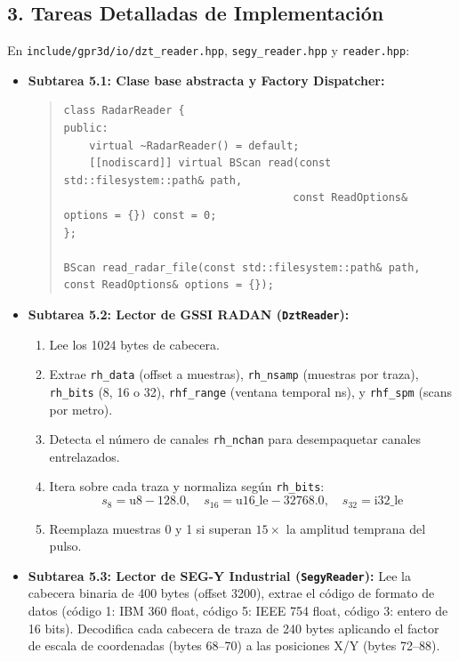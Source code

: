 \documentclass[11pt,a4paper]{article}
\begin{document}
\subsection{3. Tareas Detalladas de Implementación}
En \texttt{include/gpr3d/io/dzt\_reader.hpp}, \texttt{segy\_reader.hpp} y \texttt{reader.hpp}:
\begin{itemize}
    \item \textbf{Subtarea 5.1: Clase base abstracta y Factory Dispatcher:}
\begin{quote}
\small
\begin{verbatim}
class RadarReader {
public:
    virtual ~RadarReader() = default;
    [[nodiscard]] virtual BScan read(const std::filesystem::path& path,
                                    const ReadOptions& options = {}) const = 0;
};

BScan read_radar_file(const std::filesystem::path& path, const ReadOptions& options = {});
\end{verbatim}
\end{quote}

    \item \textbf{Subtarea 5.2: Lector de GSSI RADAN (\texttt{DztReader}):}
    \begin{enumerate}
        \item Lee los 1024 bytes de cabecera.
        \item Extrae \texttt{rh\_data} (offset a muestras), \texttt{rh\_nsamp} (muestras por traza), \texttt{rh\_bits} (8, 16 o 32), \texttt{rhf\_range} (ventana temporal ns), y \texttt{rhf\_spm} (scans por metro).
        \item Detecta el número de canales \texttt{rh\_nchan} para desempaquetar canales entrelazados.
        \item Itera sobre cada traza y normaliza según \texttt{rh\_bits}:
        \begin{equation}
            s_8 = \text{u8} - 128.0, \quad s_{16} = \text{u16\_le} - 32768.0, \quad s_{32} = \text{i32\_le}
        \end{equation}
        \item Reemplaza muestras 0 y 1 si superan $15 \times$ la amplitud temprana del pulso.
    \end{enumerate}

    \item \textbf{Subtarea 5.3: Lector de SEG-Y Industrial (\texttt{SegyReader}):}
    Lee la cabecera binaria de 400 bytes (offset 3200), extrae el código de formato de datos (código 1: IBM 360 float, código 5: IEEE 754 float, código 3: entero de 16 bits). Decodifica cada cabecera de traza de 240 bytes aplicando el factor de escala de coordenadas (bytes 68--70) a las posiciones X/Y (bytes 72--88).
\end{itemize}
\end{document}
